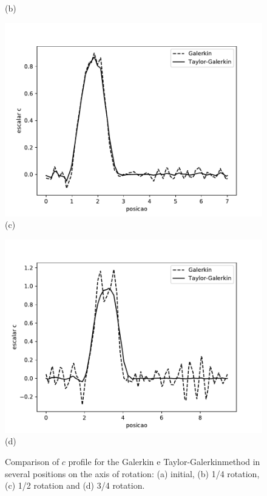 \begin{center}
\begin{figure}[H]
\begin{minipage}{.5\linewidth}
      (b)
     \end{minipage}
     \begin{minipage}{.5\linewidth}
      \centering
      \includegraphics[scale=0.53]{./02_chaps/cap_validation/figure/convection_600.pdf}\\
      (c)
     \end{minipage}%
     \begin{minipage}{.5\linewidth}
      \centering
      \includegraphics[scale=0.53]{./02_chaps/cap_validation/figure/convection_950.pdf}\\
      (d)
     \end{minipage}
     \medskip
     \caption{Comparison of $c$ profile for the Galerkin e Taylor-Galerkinmethod in several positions on the axis of rotation: 
     (a) initial, 
     (b) 1/4 rotation,
     (c) 1/2 rotation and
     (d) 3/4 rotation.}
     \label{perfil c}
\end{figure}
\end{center}

